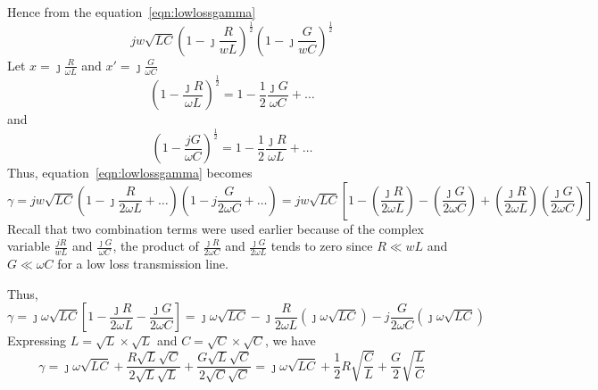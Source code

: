 Hence from the equation~\eqref{eqn:lowlossgamma}
\[jw\sqrt{LC}\left(1 - \jmath\frac{R}{wL}\right)^{\frac{1}{2}}\left(1 - \jmath\frac{G}{wC}\right)^{\frac{1}{2}}\]
Let $x = \jmath\frac{R}{\omega L}$ and $x' = \jmath\frac{G}{\omega C}$
\begin{dmath*}
\left(1 - \frac{\jmath R}{\omega L}\right)^{\frac{1}{2}} = 1 - \frac{1}{2}\frac{\jmath G}{\omega C} + \ldots
\end{dmath*}
and
\begin{dmath*}
\left(1 - \frac{jG}{\omega C}\right)^{\frac{1}{2}} = 1 - \frac{1}{2}\frac{\jmath R}{\omega L} + \ldots 
\end{dmath*}
Thus, equation~\eqref{eqn:lowlossgamma} becomes
\begin{dmath*}
\gamma = jw\sqrt{LC}\left(1 - \jmath \frac{R}{2\omega L} + \ldots\right)\left(1 - j\frac{G}{2\omega C} + \ldots\right) = jw\sqrt{LC} \left[1- \left(\frac{\jmath R}{2\omega L}\right) - \left(\frac{\jmath G}{2\omega C}\right) + \left(\frac{\jmath R}{2\omega L}\right)\left(\frac{\jmath G}{2\omega C}\right)\right]
\end{dmath*}
Recall that two combination terms were used earlier because of the complex variable $\frac{jR}{wL}$ and $\frac{\jmath G}{\omega C}$, the product of $\frac{\jmath R}{2\omega C}$ and $\frac{\jmath G}{2\omega L}$ tends to zero since $R \ll wL$ and $G \ll \omega C$ for a low loss transmission line.

Thus,
\begin{dmath}  
\gamma = \jmath\omega\sqrt{LC} \left[1- \frac{\jmath R}{2\omega L} - \frac{\jmath G}{2\omega C}\right] = \jmath\omega\sqrt{LC} - \jmath\frac{R}{2\omega L}\left(\jmath\omega\sqrt{LC}\right) - j\frac{G}{2\omega C}\left(\jmath\omega\sqrt{LC}\right)
\end{dmath}
Expressing $L = \sqrt{L} \times \sqrt{L}$ and $C = \sqrt{C} \times \sqrt{C}$, we have
\begin{dmath*}
\gamma = \jmath\omega\sqrt{LC} + \frac{R\sqrt{L}\sqrt{C}}{2\sqrt{L}\sqrt{L}} + \frac{G\sqrt{L}\sqrt{C}}{2\sqrt{C}\sqrt{C}}
= \jmath\omega\sqrt{LC} + \frac{1}{2}R\sqrt{\frac{C}{L}} + \frac{G}{2}\sqrt{\frac{L}{C}} 
\end{dmath*}

